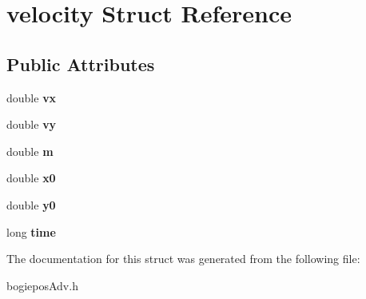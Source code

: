 \hypertarget{structvelocity}{}\section{velocity Struct Reference}
\label{structvelocity}
\subsection*{Public Attributes}
\begin{DoxyCompactItemize}
\item 
\mbox{\label{structvelocity_af782cf3f02556d206dafb4fc215e8d56}} 
double {\bfseries vx}
\item 
\mbox{\label{structvelocity_a9c63e355e599ade6afb059290220ca68}} 
double {\bfseries vy}
\item 
\mbox{\label{structvelocity_a045bd9da67384da5b1a9a9338ee1581b}} 
double {\bfseries m}
\item 
\mbox{\label{structvelocity_a93abe62f9c5fe1d96d72a04feb2bc64d}} 
double {\bfseries x0}
\item 
\mbox{\label{structvelocity_ace3302b327e857b708a315b05919e420}} 
double {\bfseries y0}
\item 
\mbox{\label{structvelocity_a47ca52e47c0a52f43d7888fb8743f824}} 
long {\bfseries time}
\end{DoxyCompactItemize}


The documentation for this struct was generated from the following file\+:\begin{DoxyCompactItemize}
\item 
bogiepos\+Adv.\+h\end{DoxyCompactItemize}
